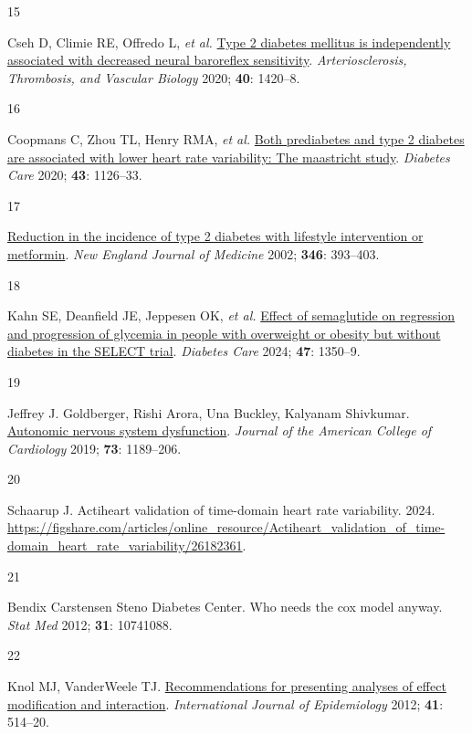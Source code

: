 \documentclass[
  a4paper,
  headsepline=true,
  open=any]{scrbook}
\newlength{\cslhangindent}
\newlength{\csllabelwidth}
\newlength{\cslentryspacingunit} %
\newenvironment{CSLReferences}[2] %
 {%
  \setlength{\parindent}{0pt}
  \ifodd #1
  \let\oldpar\par
  \def\par{\hangindent=\cslhangindent\oldpar}
  \fi
  \setlength{\parskip}{#2\cslentryspacingunit}
 }%
 {}
\newcommand{\CSLLeftMargin}[1]{\parbox[t]{\csllabelwidth}{#1}}
\newcommand{\CSLRightInline}[1]{\parbox[t]{\linewidth - \csllabelwidth}{#1}\break}
\begin{document}
\begin{CSLReferences}{0}{0}
\leavevmode{}%
\CSLLeftMargin{15 }%
\CSLRightInline{Cseh D, Climie RE, Offredo L, \emph{et al.}
\href{https://doi.org/10.1161/ATVBAHA.120.314102}{Type 2 diabetes
mellitus is independently associated with decreased neural baroreflex
sensitivity}. \emph{Arteriosclerosis, Thrombosis, and Vascular Biology}
2020; \textbf{40}: 1420--8.}

\leavevmode{}%
\CSLLeftMargin{16 }%
\CSLRightInline{Coopmans C, Zhou TL, Henry RMA, \emph{et al.}
\href{https://doi.org/10.2337/dc19-2367}{Both prediabetes and type 2
diabetes are associated with lower heart rate variability: The
maastricht study}. \emph{Diabetes Care} 2020; \textbf{43}: 1126--33.}

\leavevmode{}%
\CSLLeftMargin{17 }%
\CSLRightInline{\href{https://doi.org/10.1056/NEJMoa012512}{Reduction in
the incidence of type 2 diabetes with lifestyle intervention or
metformin}. \emph{New England Journal of Medicine} 2002; \textbf{346}:
393--403.}

\leavevmode{}%
\CSLLeftMargin{18 }%
\CSLRightInline{Kahn SE, Deanfield JE, Jeppesen OK, \emph{et al.}
\href{https://doi.org/10.2337/dc24-0491}{Effect of semaglutide on
regression and progression of glycemia in people with overweight or
obesity but without diabetes in the SELECT trial}. \emph{Diabetes Care}
2024; \textbf{47}: 1350--9.}

\leavevmode{}%
\CSLLeftMargin{19 }%
\CSLRightInline{Jeffrey J. Goldberger, Rishi Arora, Una Buckley,
Kalyanam Shivkumar.
\href{https://doi.org/doi:10.1016/j.jacc.2018.12.064}{Autonomic nervous
system dysfunction}. \emph{Journal of the American College of
Cardiology} 2019; \textbf{73}: 1189--206.}

\leavevmode{}%
\CSLLeftMargin{20 }%
\CSLRightInline{Schaarup J. Actiheart validation of time-domain heart
rate variability. 2024.
\url{https://figshare.com/articles/online_resource/Actiheart_validation_of_time-domain_heart_rate_variability/26182361}.}

\leavevmode{}%
\CSLLeftMargin{21 }%
\CSLRightInline{Bendix Carstensen Steno Diabetes Center. Who needs the
cox model anyway. \emph{Stat Med} 2012; \textbf{31}: 10741088.}

\leavevmode{}%
\CSLLeftMargin{22 }%
\CSLRightInline{Knol MJ, VanderWeele TJ.
\href{https://doi.org/10.1093/ije/dyr218}{Recommendations for presenting
analyses of effect modification and interaction}. \emph{International
Journal of Epidemiology} 2012; \textbf{41}: 514--20.}


\end{CSLReferences}
\end{document}
